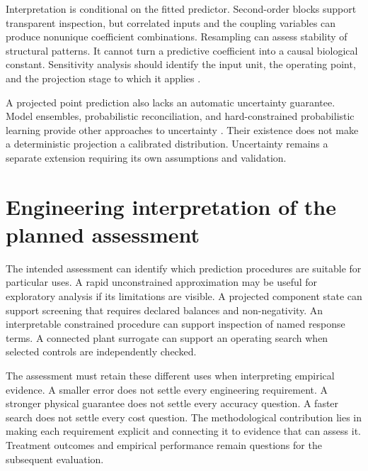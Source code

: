 Interpretation is conditional on the fitted predictor. Second-order blocks support transparent inspection, but correlated inputs and the coupling variables can produce nonunique coefficient combinations. Resampling can assess stability of structural patterns. It cannot turn a predictive coefficient into a causal biological constant. Sensitivity analysis should identify the input unit, the operating point, and the projection stage to which it applies \citep{Machado2014,Brunton2016}.

A projected point prediction also lacks an automatic uncertainty guarantee. Model ensembles, probabilistic reconciliation, and hard-constrained probabilistic learning provide other approaches to uncertainty \citep{Lakshminarayanan2017,Hansen2024,Utkarsh2025}. Their existence does not make a deterministic projection a calibrated distribution. Uncertainty remains a separate extension requiring its own assumptions and validation.

\section{Engineering interpretation of the planned assessment}

The intended assessment can identify which prediction procedures are suitable for particular uses. A rapid unconstrained approximation may be useful for exploratory analysis if its limitations are visible. A projected component state can support screening that requires declared balances and non-negativity. An interpretable constrained procedure can support inspection of named response terms. A connected plant surrogate can support an operating search when selected controls are independently checked.

The assessment must retain these different uses when interpreting empirical evidence. A smaller error does not settle every engineering requirement. A stronger physical guarantee does not settle every accuracy question. A faster search does not settle every cost question. The methodological contribution lies in making each requirement explicit and connecting it to evidence that can assess it. Treatment outcomes and empirical performance remain questions for the subsequent evaluation.
